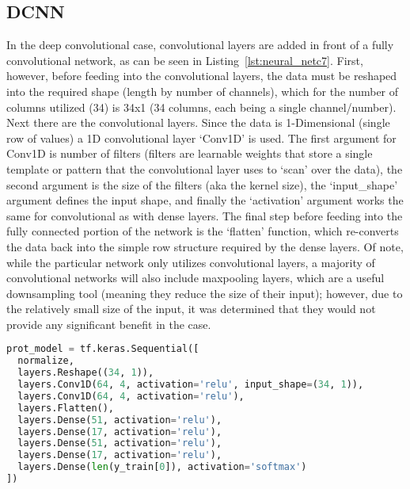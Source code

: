 \documentclass[12pt,letterpaper,oneside,reqno]{book}
\theoremstyle{plain}
\theoremstyle{definition}
\theoremstyle{plain}
\theoremstyle{remark}
\theoremstyle{plain}
\theoremstyle{definition}
\theoremstyle{plain}
\begin{document}
\subsection{DCNN} \label{subsec422}
In the deep convolutional case,  convolutional layers are added in front of a fully convolutional network, as can be seen in Listing~\ref{lst:neural_netc7}. First, however, before feeding into the convolutional layers, the data must be reshaped into the required shape (length by number of channels), which for the number of columns utilized (34) is 34x1 (34 columns, each being a single channel/number). Next there are the convolutional layers. Since the data is 1-Dimensional (single row of values) a 1D convolutional layer `Conv1D' is used. The first argument for Conv1D is number of filters (filters are learnable weights that store a single template or pattern that the convolutional layer uses to `scan' over the data), the second argument is the size of the filters (aka the kernel size), the `input\_shape' argument defines the input shape, and finally the `activation' argument works the same for convolutional as with dense layers. The final step before feeding into the fully connected portion of the network is the `flatten' function, which re-converts the data back into the simple row structure required by the dense layers. Of note, while the particular network only utilizes convolutional layers, a majority of convolutional networks will also include maxpooling layers, which are a useful downsampling tool (meaning they reduce the size of their input); however, due to the relatively small size of the input, it was determined that they would not provide any significant benefit in the case.

\begin{lstlisting}[language=Python, caption={Neural Network Model (7-class, Convolutional)}, label = lst:neural_netc7, frame=single]
prot_model = tf.keras.Sequential([
  normalize,
  layers.Reshape((34, 1)),
  layers.Conv1D(64, 4, activation='relu', input_shape=(34, 1)),
  layers.Conv1D(64, 4, activation='relu'),
  layers.Flatten(),
  layers.Dense(51, activation='relu'),
  layers.Dense(17, activation='relu'),
  layers.Dense(51, activation='relu'),
  layers.Dense(17, activation='relu'),
  layers.Dense(len(y_train[0]), activation='softmax')
])
\end{lstlisting}
\end{document}

